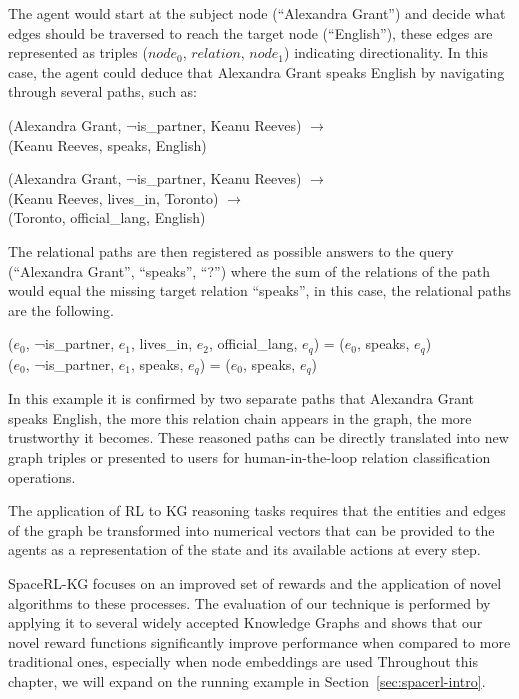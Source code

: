 The agent would start at the subject node (``Alexandra Grant'') and decide what edges should be traversed to reach the target node (``English''), these edges are represented as triples ($node_0$, $relation$, $node_1$) indicating directionality.
In this case, the agent could deduce that Alexandra Grant speaks English by navigating through several paths, such as:

\begin{center}
(Alexandra Grant, ¬is\_partner, Keanu Reeves) $\rightarrow$ \\
(Keanu Reeves, speaks, English) 
\end{center}

\begin{center}
(Alexandra Grant, ¬is\_partner, Keanu Reeves) $\rightarrow$ \\
(Keanu Reeves, lives\_in, Toronto) $\rightarrow$ \\
(Toronto, official\_lang, English)
\end{center}

The relational paths are then registered as possible answers to the query (``Alexandra Grant'', ``speaks'', ``?'') where the sum of the relations of the path would equal the missing target relation ``speaks'', in this case, the relational paths are the following.

\begin{center}
    ($e_0$, ¬is\_partner, $e_1$, lives\_in, $e_2$, official\_lang, $e_q$) = ($e_0$, speaks, $e_q$)\\
    ($e_0$, ¬is\_partner, $e_1$, speaks, $e_q$) = ($e_0$, speaks, $e_q$)
\end{center}

In this example it is confirmed by two separate paths that Alexandra Grant speaks English, the more this relation chain appears in the graph, the more trustworthy it becomes. These reasoned paths can be directly translated into new graph triples or presented to users for human-in-the-loop relation classification operations.

The application of RL to KG reasoning tasks requires that the entities and edges of the graph be transformed into numerical vectors that can be provided to the agents as a representation of the state and its available actions at every step.

SpaceRL-KG focuses on an improved set of rewards and the application of novel algorithms to these processes.
The evaluation of our technique is performed by applying it to several widely accepted Knowledge Graphs and shows that our novel reward functions significantly improve performance when compared to more traditional ones, especially when node embeddings are used
Throughout this chapter, we will expand on the running example in Section~\ref{sec:spacerl-intro}.

